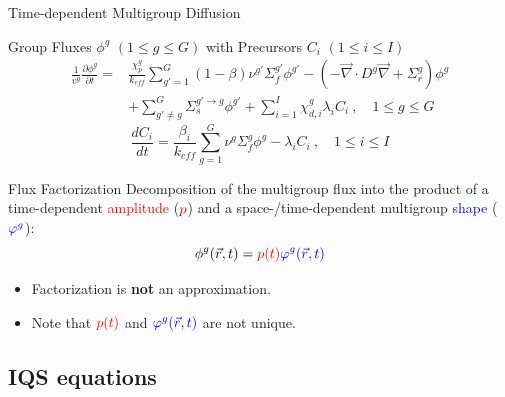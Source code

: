 \documentclass[8pt]{beamer}
\renewcommand{\div}{\vec{\nabla}\! \cdot \!}
\newcommand{\grad}{\vec{\nabla}}
\newcommand{\be}{\begin{equation*}}
\newcommand{\ee}{\end{equation*}}
\newcommand{\keff}{\ensuremath{k_{\textit{eff}}}}
\newcommand{\tcr}[1]{\textcolor{red}{#1}}
\newcommand{\tcb}[1]{\textcolor{blue}{#1}}
\begin{document}
\begin{frame}{Time-dependent Multigroup Diffusion}

\vspace{-3mm}

\begin{block}{Group Fluxes $\phi^g$ $(1 \le g \le G )$ with Precursors $C_i$ $(1 \le i \le I)$}
\begin{align*}
\frac{1}{v^g} \frac{\partial \phi^g }{\partial t} =& \frac{\chi_p^g}{\keff} \sum_{g'=1}^G (1-\beta) \nu^{g'} \Sigma_f^{g'} \phi^{g'} -  \left( -\div D^g \grad  + \Sigma_r^g \right) \phi^g  \nonumber \\
&  + \sum_{g'\neq g}^G\Sigma_s^{g'\to g} \phi^{g'}  + \sum_{i=1}^I\chi_{d,i}^g\lambda_i C_i \ , \quad 1 \le g \le G 
\end{align*}
\be
\frac{dC_i}{dt} = \frac{\beta_i}{k_{eff}}\sum_{g=1}^G\nu^{g} \Sigma_f^g \phi^{g} - \lambda_i C_i \ , \quad 1 \le i \le I 
\ee
\end{block}


\begin{block}{Flux Factorization}
Decomposition of the multigroup flux into the product of a time-dependent \tcr{amplitude} ($\tcr{p}$) and a space-/time-dependent multigroup \tcb{shape} ($\tcb{\varphi^g}$):
\begin{equation*}
\phi^g(\vec{r},t) = \tcr{p(t)} \tcb{\varphi^g(\vec{r},t)}
\end{equation*}

\begin{itemize}
\item 
Factorization is \textbf{not} an approximation.
\item
Note that $\tcr{p(t)}$ and $\tcb{\varphi^g(\vec{r},t)}$ are not unique. 
\end{itemize}
\end{block}

\end{frame}


\subsection{IQS equations}
\end{document}
